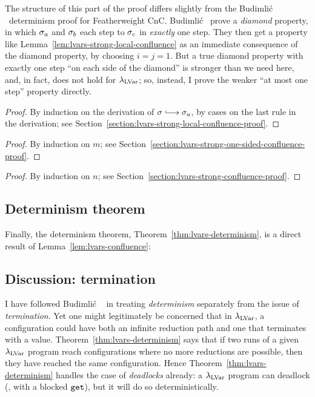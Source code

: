 The structure of this part of the proof differs slightly from the
Budimli\'c \etal~determinism proof for Featherweight CnC.  Budimli\'c
\etal~prove a \emph{diamond} property, in which $\sigma_a$ and
$\sigma_b$ each step to $\sigma_c$ in \emph{exactly} one step.  They
then get a property like Lemma~\ref{lem:lvars-strong-local-confluence}
as an immediate consequence of the diamond property, by choosing $i =
j = 1$.  But a true diamond property with exactly one step ``on each
side of the diamond'' is stronger than we need here, and, in fact,
does not hold for $\lambda_{\textrm{LVar}}$; so, instead, I prove the weaker ``at
most one step'' property directly.

\LVarsLemStrongLocalConfluence
\begin{proof}
  By induction on the derivation of $\conf \parstepsto \conf_a$, by
  cases on the last rule in the derivation; see
  Section~\ref{section:lvars-strong-local-confluence-proof}. 
\end{proof}

\LVarsLemStrongOneSidedConfluence
\begin{proof}
  By induction on $m$; see
  Section~\ref{section:lvars-strong-one-sided-confluence-proof}.
\end{proof}

\LVarsLemStrongConfluence
\begin{proof}
  By induction on $n$; see
  Section~\ref{section:lvars-strong-confluence-proof}.
\end{proof}

\LVarsLemConfluence

\subsection{Determinism theorem}

Finally, the determinism theorem, Theorem~\ref{thm:lvars-determinism},
is a direct result of Lemma~\ref{lem:lvars-confluence}:

\LVarsThmDeterminism

\subsection{Discussion: termination}

I have followed Budimli\'c \etal~\cite{CnC} in treating
\emph{determinism} separately from the issue of \emph{termination}.
Yet one might legitimately be concerned that in $\lambda_{\textrm{LVar}}$, a
configuration could have both an infinite reduction path and one that
terminates with a value.  Theorem~\ref{thm:lvars-determinism} says
that if two runs of a given $\lambda_{\textrm{LVar}}$ program reach configurations
where no more reductions are possible, then they have reached the same
configuration.  Hence Theorem~\ref{thm:lvars-determinism} handles the
case of \emph{deadlocks} already: a $\lambda_{\textrm{LVar}}$ program can deadlock
(\eg, with a blocked $\mbox{\texttt{get}}$), but it will do so deterministically.

